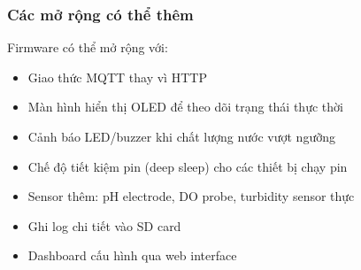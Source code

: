 \subsubsection{Các mở rộng có thể thêm}
Firmware có thể mở rộng với:
\begin{itemize}
    \item Giao thức MQTT thay vì HTTP
    \item Màn hình hiển thị OLED để theo dõi trạng thái thực thời
    \item Cảnh báo LED/buzzer khi chất lượng nước vượt ngưỡng
    \item Chế độ tiết kiệm pin (deep sleep) cho các thiết bị chạy pin
    \item Sensor thêm: pH electrode, DO probe, turbidity sensor thực
    \item Ghi log chi tiết vào SD card
    \item Dashboard cấu hình qua web interface
\end{itemize}


